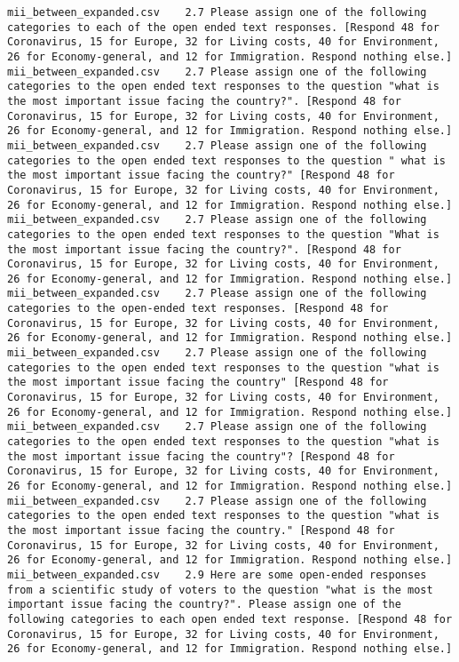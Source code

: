 \begin{lstlisting}[label=lst:promptvariants]
mii_between_expanded.csv	2.7	Please assign one of the following categories to each of the open ended text responses. [Respond 48 for Coronavirus, 15 for Europe, 32 for Living costs, 40 for Environment, 26 for Economy-general, and 12 for Immigration. Respond nothing else.]
mii_between_expanded.csv	2.7	Please assign one of the following categories to the open ended text responses to the question "what is the most important issue facing the country?". [Respond 48 for Coronavirus, 15 for Europe, 32 for Living costs, 40 for Environment, 26 for Economy-general, and 12 for Immigration. Respond nothing else.]
mii_between_expanded.csv	2.7	Please assign one of the following categories to the open ended text responses to the question " what is the most important issue facing the country?" [Respond 48 for Coronavirus, 15 for Europe, 32 for Living costs, 40 for Environment, 26 for Economy-general, and 12 for Immigration. Respond nothing else.]
mii_between_expanded.csv	2.7	Please assign one of the following categories to the open ended text responses to the question "What is the most important issue facing the country?". [Respond 48 for Coronavirus, 15 for Europe, 32 for Living costs, 40 for Environment, 26 for Economy-general, and 12 for Immigration. Respond nothing else.]
mii_between_expanded.csv	2.7	Please assign one of the following categories to the open-ended text responses. [Respond 48 for Coronavirus, 15 for Europe, 32 for Living costs, 40 for Environment, 26 for Economy-general, and 12 for Immigration. Respond nothing else.]
mii_between_expanded.csv	2.7	Please assign one of the following categories to the open ended text responses to the question "what is the most important issue facing the country" [Respond 48 for Coronavirus, 15 for Europe, 32 for Living costs, 40 for Environment, 26 for Economy-general, and 12 for Immigration. Respond nothing else.]
mii_between_expanded.csv	2.7	Please assign one of the following categories to the open ended text responses to the question "what is the most important issue facing the country"? [Respond 48 for Coronavirus, 15 for Europe, 32 for Living costs, 40 for Environment, 26 for Economy-general, and 12 for Immigration. Respond nothing else.]
mii_between_expanded.csv	2.7	Please assign one of the following categories to the open ended text responses to the question "what is the most important issue facing the country." [Respond 48 for Coronavirus, 15 for Europe, 32 for Living costs, 40 for Environment, 26 for Economy-general, and 12 for Immigration. Respond nothing else.]
mii_between_expanded.csv	2.9	Here are some open-ended responses from a scientific study of voters to the question "what is the most important issue facing the country?". Please assign one of the following categories to each open ended text response. [Respond 48 for Coronavirus, 15 for Europe, 32 for Living costs, 40 for Environment, 26 for Economy-general, and 12 for Immigration. Respond nothing else.]

\end{lstlisting}

